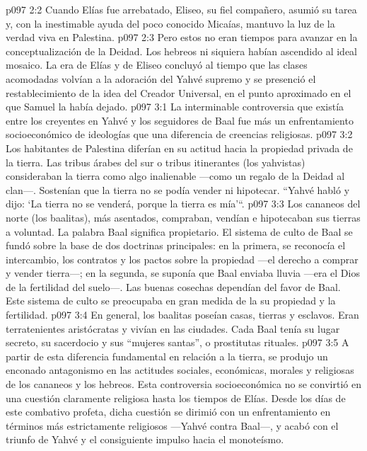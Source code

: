 \vs p097 2:2 Cuando Elías fue arrebatado, Eliseo, su fiel compañero, asumió su tarea y, con la inestimable ayuda del poco conocido Micaías, mantuvo la luz de la verdad viva en Palestina.
\vs p097 2:3 Pero estos no eran tiempos para avanzar en la conceptualización de la Deidad. Los hebreos ni siquiera habían ascendido al ideal mosaico. La era de Elías y de Eliseo concluyó al tiempo que las clases acomodadas volvían a la adoración del Yahvé supremo y se presenció el restablecimiento de la idea del Creador Universal, en el punto aproximado en el que Samuel la había dejado.
\vs p097 3:1 La interminable controversia que existía entre los creyentes en Yahvé y los seguidores de Baal fue más un enfrentamiento socioeconómico de ideologías que una diferencia de creencias religiosas.
\vs p097 3:2 \pc Los habitantes de Palestina diferían en su actitud hacia la propiedad privada de la tierra. Las tribus árabes del sur o tribus itinerantes (los yahvistas) consideraban la tierra como algo inalienable ---como un regalo de la Deidad al clan---. Sostenían que la tierra no se podía vender ni hipotecar. “Yahvé habló y dijo: ‘La tierra no se venderá, porque la tierra es mía'“.
\vs p097 3:3 Los cananeos del norte (los baalitas), más asentados, compraban, vendían e hipotecaban sus tierras a voluntad. La palabra Baal significa propietario. El sistema de culto de Baal se fundó sobre la base de dos doctrinas principales: en la primera, se reconocía el intercambio, los contratos y los pactos sobre la propiedad ---el derecho a comprar y vender tierra---; en la segunda, se suponía que Baal enviaba lluvia ---era el Dios de la fertilidad del suelo---. Las buenas cosechas dependían del favor de Baal. Este sistema de culto se preocupaba en gran medida de la  su propiedad y la fertilidad.
\vs p097 3:4 En general, los baalitas poseían casas, tierras y esclavos. Eran terratenientes aristócratas y vivían en las ciudades. Cada Baal tenía su lugar secreto, su sacerdocio y sus “mujeres santas”, o prostitutas rituales.
\vs p097 3:5 A partir de esta diferencia fundamental en relación a la tierra, se produjo un enconado antagonismo en las actitudes sociales, económicas, morales y religiosas de los cananeos y los hebreos. Esta controversia socioeconómica no se convirtió en una cuestión claramente religiosa hasta los tiempos de Elías. Desde los días de este combativo profeta, dicha cuestión se dirimió con un enfrentamiento en términos más estrictamente religiosos ---Yahvé contra Baal---, y acabó con el triunfo de Yahvé y el consiguiente impulso hacia el monoteísmo.
